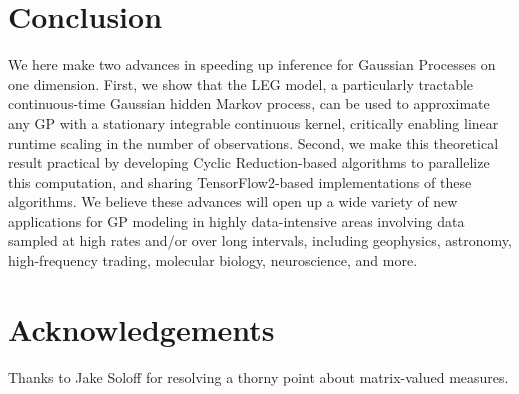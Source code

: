 \documentclass{article}
\theoremstyle{definition}
\begin{document}
\section{Conclusion}

We here make two advances in speeding up inference for Gaussian Processes on one dimension.  First, we show that the LEG model, a particularly tractable continuous-time Gaussian hidden Markov process, can be used to approximate any GP with a stationary integrable continuous kernel, critically enabling linear runtime scaling in the number of observations.  Second, we make this theoretical result practical by developing Cyclic Reduction-based algorithms to parallelize this computation, and sharing TensorFlow2-based implementations of these algorithms.  We believe these advances will open up a wide variety of new applications for GP modeling in highly data-intensive areas involving data sampled at high rates and/or over long intervals, including geophysics, astronomy, high-frequency trading, molecular biology, neuroscience, and more.

\section*{Acknowledgements}

Thanks to Jake Soloff for resolving a thorny point about matrix-valued measures.    



\end{document}
